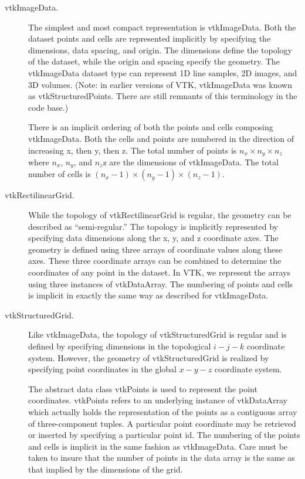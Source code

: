 \begin{description}

\item[vtkImageData.] The simplest and most compact representation is vtkImageData. Both the dataset points and cells are represented implicitly by specifying the dimensions, data spacing, and origin. The dimensions define the topology of the dataset, while the origin and spacing specify the geometry. The vtkImageData dataset type can represent 1D line samples, 2D images, and 3D volumes. (Note: in earlier versions of VTK, vtkImageData was known as vtkStructuredPoints. There are still remnants of this terminology in the code base.)

There is an implicit ordering of both the points and cells composing vtkImageData. Both the cells and points are numbered in the direction of increasing x, then y, then z. The total number of points is $n_x \times n_y \times n_z$ where $n_x$, $n_y$, and $n_z$z are the dimensions of vtkImageData. The total number of cells is $(n_x - 1) \times  (n_y - 1) \times (n_z - 1)$.

\item[vtkRectilinearGrid.] While the topology of vtkRectilinearGrid is regular, the geometry can be described as “semi-regular.” The topology is implicitly represented by specifying data dimensions along the x, y, and z coordinate axes. The geometry is defined using three arrays of coordinate values along these axes. These three coordinate arrays can be combined to determine the coordinates of any point in the dataset. In VTK, we represent the arrays using three instances of vtkDataArray. The numbering of points and cells is implicit in exactly the same way as described for vtkImageData.

\item[vtkStructuredGrid.] Like vtkImageData, the topology of vtkStructuredGrid is regular and is defined by specifying dimensions in the topological $i-j-k$ coordinate system. However, the geometry of vtkStructuredGrid is realized by specifying point coordinates in the global $x-y-z$ coordinate system.

The abstract data class vtkPoints is used to represent the point coordinates. vtkPoints refers to an underlying instance of vtkDataArray which actually holds the representation of the points as a contiguous array of three-component tuples. A particular point coordinate may be retrieved or inserted by specifying a particular point id. The numbering of the points and cells is implicit in the same fashion as vtkImageData. Care must be taken to insure that the number of points in the data array is the same as that implied by the dimensions of the grid.


\end{description}
